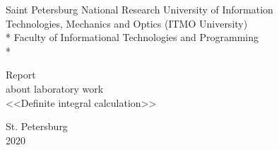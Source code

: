 \newpage
\begin{titlepage}

\begin{center}\large{
    Saint Petersburg National Research University of Information \\
    Technologies, Mechanics and Optics (ITMO University) \\*
    Faculty of Informational Technologies and Programming \\*
}\end{center}

\vspace{12em}

\begin{center}\large{
    Report \\
    about laboratory work  \\
    <<Definite integral calculation>>
}\end{center}

\vspace{8.5em}

\vspace{1.5em}

\vspace{\fill}

\begin{center}
    St. Petersburg \\
    2020
\end{center}

\end{titlepage}
